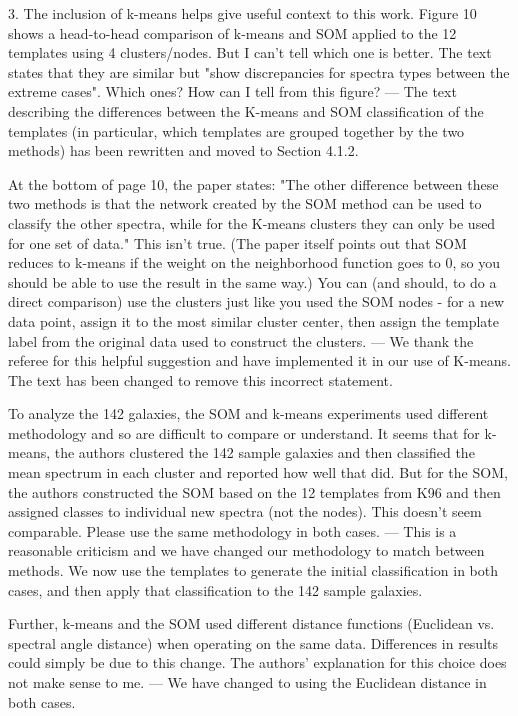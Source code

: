 3. The inclusion of k-means helps give useful context to this work. Figure 10 shows a head-to-head comparison of k-means and SOM applied to the 12 templates using 4 clusters/nodes.  But I can't tell which one is better.  The text states that they are similar but "show discrepancies for spectra types between the extreme cases".  Which ones?  How can I tell from this figure?
--- The text describing the differences between the K-means and SOM classification of the templates (in particular, which templates are grouped together by the two methods) has been rewritten and moved to Section 4.1.2. 

At the bottom of page 10, the paper states: "The other difference between these two methods is that the network created by the SOM method can be used to classify the other spectra, while for the K-means clusters they can only be used for one set of data."  This isn't true.  (The paper itself points out that SOM reduces to k-means if the weight on the neighborhood function goes to 0, so you should be able to use the result in the same way.)  You can (and should, to do a direct comparison) use the clusters just like you used the SOM nodes - for a new data point, assign it to the most similar cluster center, then assign the template label from the original data used to construct the clusters.
--- We thank the referee for this helpful suggestion and have implemented it in our use of K-means. The text has been changed to remove this incorrect statement.

To analyze the 142 galaxies, the SOM and k-means experiments used different methodology and so are difficult to compare or understand. It seems that for k-means, the authors clustered the 142 sample galaxies and then classified the mean spectrum in each cluster and reported how well that did.  But for the SOM, the authors constructed the SOM based on the 12 templates from K96 and then assigned classes to individual new spectra (not the nodes).  This doesn't seem comparable.  Please use the same methodology in both cases.
--- This is a reasonable criticism and we have changed our methodology to match between methods. We now use the templates to generate the initial classification in both cases, and then apply that classification to the 142 sample galaxies.


Further, k-means and the SOM used different distance functions (Euclidean vs. spectral angle distance) when operating on the same data.  Differences in results could simply be due to this change.  The authors' explanation for this choice does not make sense to me.
--- We have changed to using the Euclidean distance in both cases.

